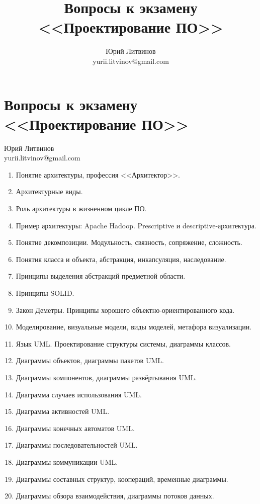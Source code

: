 \documentclass[a5paper]{article}
\title{Вопросы к экзамену <<Проектирование ПО>>}
\author{Юрий Литвинов\\\small{yurii.litvinov@gmail.com}}
\begin{document}
\thispagestyle{empty}

\section*{Вопросы к экзамену <<Проектирование ПО>>}

\begin{flushright}\begin{small}Юрий Литвинов\\\small{yurii.litvinov@gmail.com}\end{small}\end{flushright}

\begin{enumerate}
    \item Понятие архитектуры, профессия <<Архитектор>>.
    \item Архитектурные виды.
    \item Роль архитектуры в жизненном цикле ПО.
    \item Пример архитектуры: Apache Hadoop. Prescriptive и descriptive-архитектура.
    \item Понятие декомпозиции. Модульность, связность, сопряжение, сложность.
    \item Понятия класса и объекта, абстракция, инкапсуляция, наследование. 
    \item Принципы выделения абстракций предметной области.
    \item Принципы SOLID.
    \item Закон Деметры. Принципы хорошего объектно-ориентированного кода.
    \item Моделирование, визуальные модели, виды моделей, метафора визуализации.
    \item Язык UML. Проектирование структуры системы, диаграммы классов.
    \item Диаграммы объектов, диаграммы пакетов UML.
    \item Диаграммы компонентов, диаграммы развёртывания UML.
    \item Диаграмма случаев использования UML.
    \item Диаграмма активностей UML.
    \item Диаграммы конечных автоматов UML.
    \item Диаграммы последовательностей UML.
    \item Диаграммы коммуникации UML.
    \item Диаграммы составных структур, коопераций, временные диаграммы.
    \item Диаграммы обзора взаимодействия, диаграммы потоков данных.

\end{enumerate}
\end{document}
